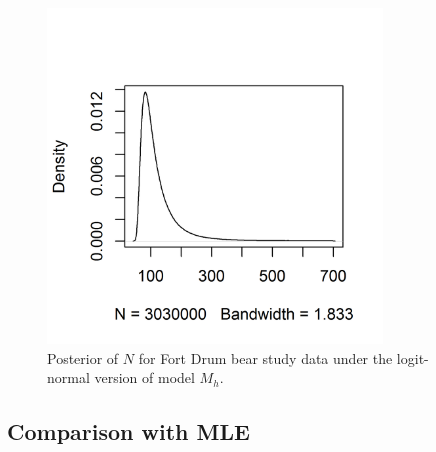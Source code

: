\begin{figure}[ht]
\centering
\includegraphics[height=3.5in,width=3.5in]{Ch3-Closed/figs/bear-modelMh-post-v2}
\caption{Posterior of $N$ for Fort Drum bear study data under the
logit-normal version of model $M_h$.
}
\label{closed.fig.bearMh}
\end{figure}

\subsection{Comparison with MLE}


